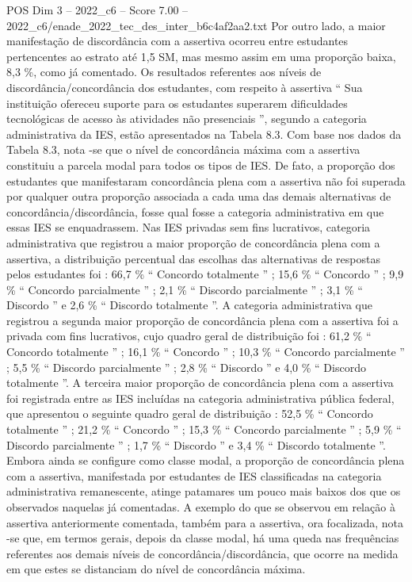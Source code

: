 \begin{textsample}{POS Dim 3 – 2022\_c6 – Score 7.00 – 2022\_c6/enade\_2022\_tec\_des\_inter\_b6c4af2aa2.txt}
Por outro lado, a maior manifestação de discordância com a assertiva ocorreu entre estudantes pertencentes ao estrato até 1,5 SM, mas mesmo assim em uma proporção baixa, 8,3 \%, como já comentado.
Os resultados referentes aos níveis de discordância/concordância dos estudantes, com respeito à assertiva “ Sua instituição ofereceu suporte para os estudantes superarem dificuldades tecnológicas de acesso às atividades não presenciais ”, segundo a categoria administrativa da IES, estão apresentados na Tabela 8.3.
Com base nos dados da Tabela 8.3, nota -se que o nível de concordância máxima com a assertiva constituiu a parcela modal para todos os tipos de IES.
De fato, a proporção dos estudantes que manifestaram concordância plena com a assertiva não foi superada por qualquer outra proporção associada a cada uma das demais alternativas de concordância/discordância, fosse qual fosse a categoria administrativa em que essas IES se enquadrassem.
Nas IES privadas sem fins lucrativos, categoria administrativa que registrou a maior proporção de concordância plena com a assertiva, a distribuição percentual das escolhas das alternativas de respostas pelos estudantes foi : 66,7 \% “ Concordo totalmente ” ; 15,6 \% “ Concordo ” ; 9,9 \% “ Concordo parcialmente ” ; 2,1 \% “ Discordo parcialmente ” ; 3,1 \% “ Discordo ” e 2,6 \% “ Discordo totalmente ”.
A categoria administrativa que registrou a segunda maior proporção de concordância plena com a assertiva foi a privada com fins lucrativos, cujo quadro geral de distribuição foi : 61,2 \% “ Concordo totalmente ” ; 16,1 \% “ Concordo ” ; 10,3 \% “ Concordo parcialmente ” ; 5,5 \% “ Discordo parcialmente ” ; 2,8 \% “ Discordo ” e 4,0 \% “ Discordo totalmente ”.
A terceira maior proporção de concordância plena com a assertiva foi registrada entre as IES incluídas na categoria administrativa pública federal, que apresentou o seguinte quadro geral de distribuição : 52,5 \% “ Concordo totalmente ” ; 21,2 \% “ Concordo ” ; 15,3 \% “ Concordo parcialmente ” ; 5,9 \% “ Discordo parcialmente ” ; 1,7 \% “ Discordo ” e 3,4 \% “ Discordo totalmente ”.
Embora ainda se configure como classe modal, a proporção de concordância plena com a assertiva, manifestada por estudantes de IES classificadas na categoria administrativa remanescente, atinge patamares um pouco mais baixos dos que os observados naquelas já comentadas.
A exemplo do que se observou em relação à assertiva anteriormente comentada, também para a assertiva, ora focalizada, nota -se que, em termos gerais, depois da classe modal, há uma queda nas frequências referentes aos demais níveis de concordância/discordância, que ocorre na medida em que estes se distanciam do nível de concordância máxima.

\end{textsample}
